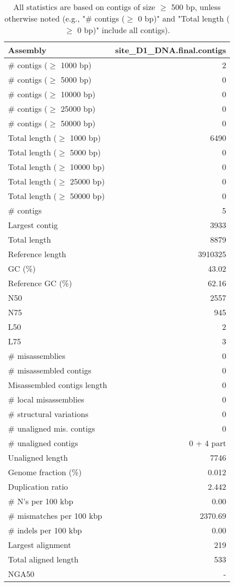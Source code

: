 \documentclass[12pt,a4paper]{article}
\begin{document}
\begin{table}[ht]
\begin{center}
\caption{All statistics are based on contigs of size $\geq$ 500 bp, unless otherwise noted (e.g., "\# contigs ($\geq$ 0 bp)" and "Total length ($\geq$ 0 bp)" include all contigs).}
\begin{tabular}{|l*{1}{|r}|}
\hline
Assembly & site\_D1\_DNA.final.contigs \\ \hline
\# contigs ($\geq$ 1000 bp) & 2 \\ \hline
\# contigs ($\geq$ 5000 bp) & 0 \\ \hline
\# contigs ($\geq$ 10000 bp) & 0 \\ \hline
\# contigs ($\geq$ 25000 bp) & 0 \\ \hline
\# contigs ($\geq$ 50000 bp) & 0 \\ \hline
Total length ($\geq$ 1000 bp) & 6490 \\ \hline
Total length ($\geq$ 5000 bp) & 0 \\ \hline
Total length ($\geq$ 10000 bp) & 0 \\ \hline
Total length ($\geq$ 25000 bp) & 0 \\ \hline
Total length ($\geq$ 50000 bp) & 0 \\ \hline
\# contigs & 5 \\ \hline
Largest contig & 3933 \\ \hline
Total length & 8879 \\ \hline
Reference length & 3910325 \\ \hline
GC (\%) & 43.02 \\ \hline
Reference GC (\%) & 62.16 \\ \hline
N50 & 2557 \\ \hline
N75 & 945 \\ \hline
L50 & 2 \\ \hline
L75 & 3 \\ \hline
\# misassemblies & 0 \\ \hline
\# misassembled contigs & 0 \\ \hline
Misassembled contigs length & 0 \\ \hline
\# local misassemblies & 0 \\ \hline
\# structural variations & 0 \\ \hline
\# unaligned mis. contigs & 0 \\ \hline
\# unaligned contigs & 0 + 4 part \\ \hline
Unaligned length & 7746 \\ \hline
Genome fraction (\%) & 0.012 \\ \hline
Duplication ratio & 2.442 \\ \hline
\# N's per 100 kbp & 0.00 \\ \hline
\# mismatches per 100 kbp & 2370.69 \\ \hline
\# indels per 100 kbp & 0.00 \\ \hline
Largest alignment & 219 \\ \hline
Total aligned length & 533 \\ \hline
NGA50 & - \\ \hline
\end{tabular}
\end{center}
\end{table}
\end{document}
